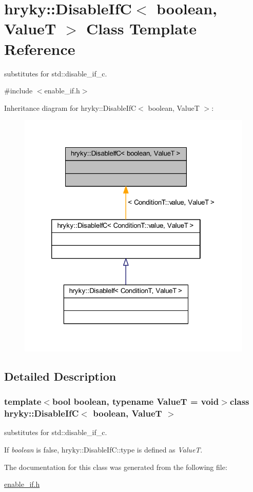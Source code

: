\hypertarget{classhryky_1_1_disable_if_c}{\section{hryky\-:\-:Disable\-If\-C$<$ boolean, Value\-T $>$ Class Template Reference}
\label{classhryky_1_1_disable_if_c}
}


substitutes for std\-::disable\-\_\-if\-\_\-c.  




{\ttfamily \#include $<$enable\-\_\-if.\-h$>$}



Inheritance diagram for hryky\-:\-:Disable\-If\-C$<$ boolean, Value\-T $>$\-:
\nopagebreak
\begin{figure}[H]
\begin{center}
\leavevmode
\includegraphics[width=320pt]{classhryky_1_1_disable_if_c__inherit__graph}
\end{center}
\end{figure}


\subsection{Detailed Description}
\subsubsection*{template$<$bool boolean, typename Value\-T = void$>$class hryky\-::\-Disable\-If\-C$<$ boolean, Value\-T $>$}

substitutes for std\-::disable\-\_\-if\-\_\-c. 

If {\itshape boolean\/} is false, hryky\-::\-Disable\-If\-C\-::type is defined as {\itshape Value\-T\/}. 

The documentation for this class was generated from the following file\-:\begin{DoxyCompactItemize}
\item 
\hyperlink{enable__if_8h}{enable\-\_\-if.\-h}\end{DoxyCompactItemize}
